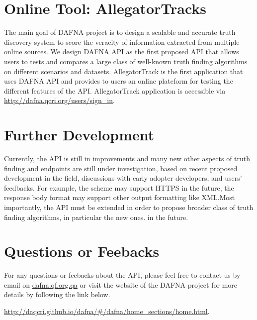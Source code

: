\documentclass[a4paper,10pt]{scrartcl}
\begin{document}
\section{Online Tool: AllegatorTracks}
The main goal of DAFNA project is to design a scalable and accurate truth discovery system to score the veracity of information extracted from multiple 
online sources.  We design DAFNA API as the first proposed API that allows users to tests and compares a large class of well-known truth finding algorithms
on different scenarios and datasets. AllegatorTrack is the first application that uses DAFNA API and provides to users
an online plateform for testing the different features of the API. AllegatorTrack application is accessible via \href{http://dafna.qcri.org/users/sign\_in}{http://dafna.qcri.org/users/sign\_in}.

\section{Further Development}
Currently, the API is still in improvements and many new other aspects of truth finding and endpoints are still under investigation, based on recent
proposed development in the field, discussions with early adopter developers, and users' feedbacks. For example, the scheme may support HTTPS in the 
future, the response body format may support other output formatting like XML.Most importantly, the API must be extended in order to propose broader 
class of truth finding algorithms, in particular the new ones.
in the future.

\section{Questions or Feebacks}
For any questions or feebacks about the API, please feel free to contact us by email on \href{mailto:lberti@qf.org.qa}{dafna.qf.org.qa}
or visit the website of the DAFNA project for more details by following the link below.

\href{http://daqcri.github.io/dafna/\#/dafna/home\_sections/home.html}{http://daqcri.github.io/dafna/\#/dafna/home\_sections/home.html}.
\end{document}
